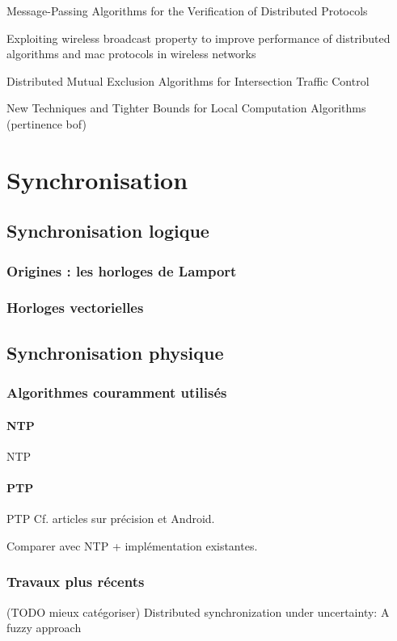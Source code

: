 Message-Passing Algorithms for the Verification of Distributed Protocols

Exploiting wireless broadcast property to improve performance of distributed algorithms and mac protocols in wireless networks

Distributed Mutual Exclusion Algorithms for Intersection Traffic Control

New Techniques and Tighter Bounds for Local Computation Algorithms (pertinence bof)

\section{Synchronisation}

\subsection{Synchronisation logique}
\subsubsection{Origines : les horloges de Lamport}
\subsubsection{Horloges vectorielles}

\subsection{Synchronisation physique}
\subsubsection{Algorithmes couramment utilisés}
\paragraph{NTP}
\ac{NTP}
\paragraph{PTP}
\ac{PTP}
Cf. articles sur précision et Android. 

Comparer avec NTP + implémentation existantes.

\subsubsection{Travaux plus récents}
(TODO mieux catégoriser)
Distributed synchronization under uncertainty: A fuzzy approach

